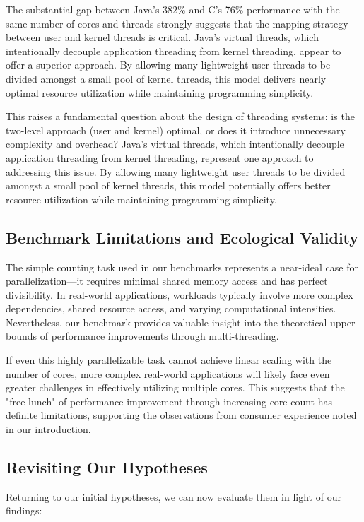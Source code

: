\documentclass[12pt,a4paper]{article}
\begin{document}
The substantial gap between Java's 382\% and C's 76\% performance with the same number of cores and threads strongly suggests that the mapping strategy between user and kernel threads is critical. Java's virtual threads, which intentionally decouple application threading from kernel threading, appear to offer a superior approach. By allowing many lightweight user threads to be divided amongst a small pool of kernel threads, this model delivers nearly optimal resource utilization while maintaining programming simplicity.

This raises a fundamental question about the design of threading systems: is the two-level approach (user and kernel) optimal, or does it introduce unnecessary complexity and overhead? Java's virtual threads, which intentionally decouple application threading from kernel threading, represent one approach to addressing this issue. By allowing many lightweight user threads to be divided amongst a small pool of kernel threads, this model potentially offers better resource utilization while maintaining programming simplicity.

\subsection{Benchmark Limitations and Ecological Validity}

The simple counting task used in our benchmarks represents a near-ideal case for parallelization—it requires minimal shared memory access and has perfect divisibility. In real-world applications, workloads typically involve more complex dependencies, shared resource access, and varying computational intensities. Nevertheless, our benchmark provides valuable insight into the theoretical upper bounds of performance improvements through multi-threading.

If even this highly parallelizable task cannot achieve linear scaling with the number of cores, more complex real-world applications will likely face even greater challenges in effectively utilizing multiple cores. This suggests that the "free lunch" of performance improvement through increasing core count has definite limitations, supporting the observations from consumer experience noted in our introduction.

\subsection{Revisiting Our Hypotheses}

Returning to our initial hypotheses, we can now evaluate them in light of our findings:
\end{document}
